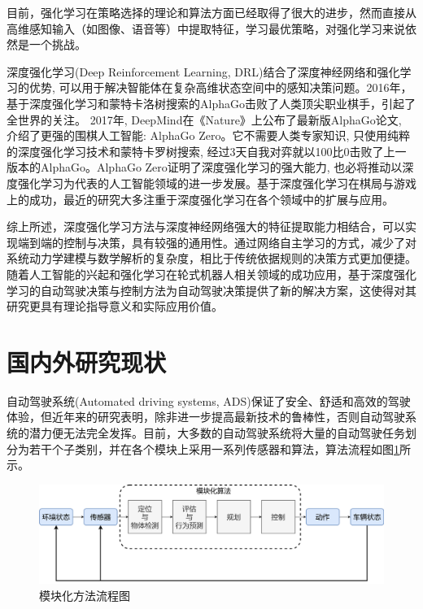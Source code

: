 目前，强化学习在策略选择的理论和算法方面已经取得了很大的进步，然而直接从高维感知输入（如图像、语音等）中提取特征，学习最优策略，对强化学习来说依然是一个挑战。

深度强化学习(Deep Reinforcement Learning, DRL)结合了深度神经网络和强化学习的优势, 可以用于解决智能体在复杂高维状态空间中的感知决策问题\cite{唐振韬2017深度强化学习进展}\cite{2017Deep}。2016年，基于深度强化学习和蒙特卡洛树搜索的AlphaGo击败了人类顶尖职业棋手，引起了全世界的关注\cite{2017Review}。 2017年, DeepMind在《Nature》上公布了最新版AlphaGo论文, 介绍了更强的围棋人工智能: AlphaGo Zero。它不需要人类专家知识, 只使用纯粹的深度强化学习技术和蒙特卡罗树搜索, 经过3天自我对弈就以100比0击败了上一版本的AlphaGo。AlphaGo Zero证明了深度强化学习的强大能力, 也必将推动以深度强化学习为代表的人工智能领域的进一步发展。基于深度强化学习在棋局与游戏上的成功，最近的研究大多注重于深度强化学习在各个领域中的扩展与应用。

综上所述，深度强化学习方法与深度神经网络强大的特征提取能力相结合，可以实现端到端的控制与决策，具有较强的通用性。通过网络自主学习的方式，减少了对系统动力学建模与数学解析的复杂度，相比于传统依据规则的决策方式更加便捷。随着人工智能的兴起和强化学习在轮式机器人相关领域的成功应用，基于深度强化学习的自动驾驶决策与控制方法为自动驾驶决策提供了新的解决方案，这使得对其研究更具有理论指导意义和实际应用价值。

\section{国内外研究现状} %

自动驾驶系统(Automated driving systems, ADS)保证了安全、舒适和高效的驾驶体验，但近年来的研究表明，除非进一步提高最新技术的鲁棒性，否则自动驾驶系统的潜力便无法完全发挥\cite{2019AutoDrive}。目前，大多数的自动驾驶系统将大量的自动驾驶任务划分为若干个子类别，并在各个模块上采用一系列传感器和算法，算法流程如图\ref{模块化方法流程图}所示。

\begin{figure}[htbp]
  \vspace{13pt} %
  \centering
  \includegraphics[width=1.0\textwidth]{images/chapter1/Autodrive_structure.png}
  \caption{模块化方法流程图}\label{模块化方法流程图} %
\end{figure}

